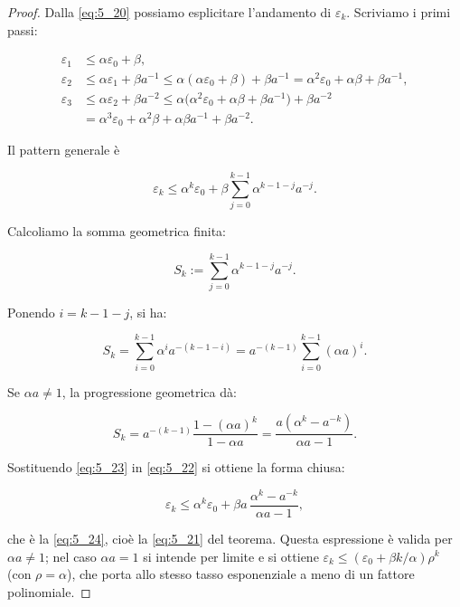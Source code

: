 \documentclass[a4paper,12pt]{article}
\numberwithin{equation}{section}
\numberwithin{figure}{section}
\numberwithin{table}{section}
\begin{document}
\begin{proof}


Dalla \eqref{eq:5_20} possiamo esplicitare l'andamento di $\varepsilon_k$. Scriviamo i primi passi:

\begin{align*}
\varepsilon_1 &\le \alpha \varepsilon_0 + \beta, \\
\varepsilon_2 &\le \alpha \varepsilon_1 + \beta a^{-1}
\le \alpha(\alpha \varepsilon_0 + \beta)+\beta a^{-1}
= \alpha^2 \varepsilon_0 + \alpha\beta + \beta a^{-1}, \\
\varepsilon_3 &\le \alpha \varepsilon_2 + \beta a^{-2}
\le \alpha\bigl(\alpha^2 \varepsilon_0 + \alpha\beta + \beta a^{-1}\bigr) + \beta a^{-2} \\
&= \alpha^3 \varepsilon_0 + \alpha^2\beta + \alpha\beta a^{-1} + \beta a^{-2}.
\end{align*}

Il pattern generale è

\begin{equation}
\varepsilon_k \le \alpha^k \varepsilon_0 + \beta \sum_{j=0}^{k-1} \alpha^{k-1-j} a^{-j}. \tag{5.22}\label{eq:5_22}
\end{equation}

Calcoliamo la somma geometrica finita:

\[
S_k := \sum_{j=0}^{k-1} \alpha^{k-1-j} a^{-j}.
\]

Ponendo $i = k-1-j$, si ha:

\[
S_k = \sum_{i=0}^{k-1} \alpha^{i} a^{-(k-1-i)}
= a^{-(k-1)} \sum_{i=0}^{k-1} (\alpha a)^i.
\]

Se $\alpha a \neq 1$, la progressione geometrica dà:

\begin{equation}
S_k = a^{-(k-1)} \frac{1 - (\alpha a)^k}{1 - \alpha a}
= \frac{a(\alpha^k - a^{-k})}{\alpha a - 1}. \tag{5.23}\label{eq:5_23}
\end{equation}

Sostituendo \eqref{eq:5_23} in \eqref{eq:5_22} si ottiene la forma chiusa:

\begin{equation}
\varepsilon_k \le \alpha^k \varepsilon_0 + \beta a\,\frac{\alpha^k - a^{-k}}{\alpha a - 1}, \tag{5.24}\label{eq:5_24}
\end{equation}

che è la \eqref{eq:5_24}, cioè la \eqref{eq:5_21} del teorema. Questa espressione è valida per $\alpha a \neq 1$; nel caso $\alpha a = 1$ si intende per limite e si ottiene $\varepsilon_k \le (\varepsilon_0 + \beta k/\alpha)\rho^k$ (con $\rho = \alpha$), che porta allo stesso tasso esponenziale a meno di un fattore polinomiale.


\end{proof}
\end{document}
